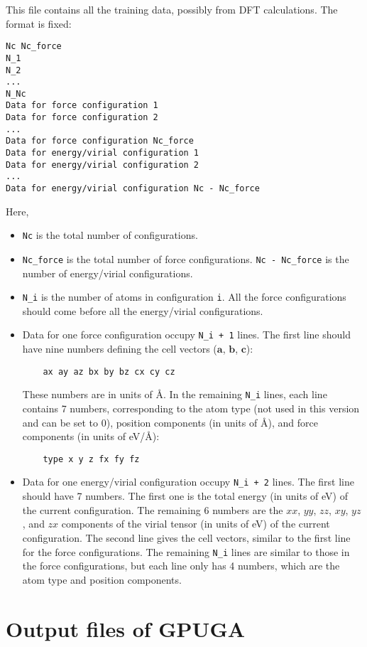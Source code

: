 \documentclass[12pt,a4paper]{report}
\newcommand{\vect}[1]{\boldsymbol{#1}}
\begin{document}
This file contains all the training data, possibly from DFT calculations. The format is fixed:
\begin{verbatim}
Nc Nc_force
N_1
N_2
...
N_Nc
Data for force configuration 1
Data for force configuration 2
...
Data for force configuration Nc_force
Data for energy/virial configuration 1
Data for energy/virial configuration 2
...
Data for energy/virial configuration Nc - Nc_force
\end{verbatim}
Here, 
\begin{itemize}
\item \verb"Nc" is the total number of configurations.
\item \verb"Nc_force" is the total number of force configurations. \verb"Nc - Nc_force" is the number of energy/virial configurations.
\item \verb"N_i" is the number of atoms in configuration \verb"i". All the force configurations should come before all the energy/virial configurations.
\item Data for one force configuration occupy \verb"N_i + 1" lines. The first line should have nine numbers defining the cell vectors ($\vect{a}$, $\vect{b}$, $\vect{c}$):
\begin{verbatim}
    ax ay az bx by bz cx cy cz
\end{verbatim} 
These numbers are in units of \AA. In the remaining \verb"N_i" lines, each line contains 7 numbers, corresponding to the atom type (not used in this version and can be set to 0), position components (in units of \AA), and force components (in units of eV/\AA):
\begin{verbatim}
    type x y z fx fy fz
\end{verbatim} 
\item Data for one energy/virial configuration occupy \verb"N_i + 2" lines. The first line should have 7 numbers. The first one is the total energy (in units of eV) of the current configuration. The remaining 6 numbers are the $xx$, $yy$, $zz$, $xy$, $yz$, and $zx$ components of the virial tensor (in units of eV) of the current configuration. The second line gives the cell vectors, similar to the first line for the force configurations. The remaining \verb"N_i" lines are similar to those in the force configurations, but each line only has 4 numbers, which are the atom type and position components.
\end{itemize}

\section{Output files of GPUGA}
\end{document}
